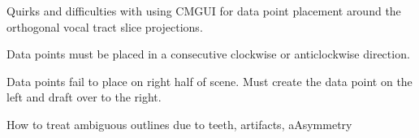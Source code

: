 Quirks and difficulties with using CMGUI for data point placement around the orthogonal vocal tract slice projections.

Data points must be placed in a consecutive clockwise or anticlockwise direction.

Data points fail to place on right half of scene. Must create the data point on the left and draft over to the right.

How to treat ambiguous outlines due to teeth, artifacts, aAsymmetry